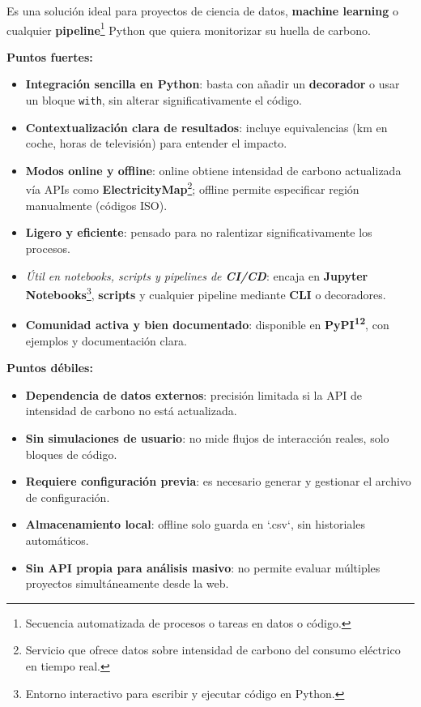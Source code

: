 \documentclass[12pt,a4paper]{report}
\begin{document}
Es una solución ideal para proyectos de ciencia de datos, \textbf{machine learning} o
cualquier \textbf{pipeline}\footnote{Secuencia automatizada de procesos o
  tareas en datos o código.} Python que quiera monitorizar su huella de carbono.

\textbf{Puntos fuertes:}
\begin{itemize}
  \item \textbf{Integración sencilla en Python}: basta con añadir un \textbf{decorador} o usar un bloque \texttt{with}, sin alterar significativamente el código.
  \item \textbf{Contextualización clara de resultados}: incluye equivalencias (km en coche, horas de televisión) para entender el impacto.
  \item \textbf{Modos online y offline}: online obtiene intensidad de carbono actualizada vía APIs como \textbf{ElectricityMap}\footnote{Servicio que ofrece datos sobre intensidad de carbono del consumo eléctrico en tiempo real.}; offline permite especificar región manualmente (códigos ISO).
  \item \textbf{Ligero y eficiente}: pensado para no ralentizar significativamente los procesos.
  \item \textit{Útil en notebooks, scripts y pipelines de \textbf{CI/CD}}: encaja en \textbf{Jupyter Notebooks}\footnote{Entorno interactivo para escribir y ejecutar código en Python.}, \textbf{scripts} y cualquier pipeline mediante \textbf{CLI} o decoradores.
  \item \textbf{Comunidad activa y bien documentado}: disponible en \textbf{PyPI\textsuperscript{12}}, con ejemplos y documentación clara.
\end{itemize}

\textbf{Puntos débiles:}
\begin{itemize}
  \item \textbf{Dependencia de datos externos}: precisión limitada si la API de intensidad de carbono no está actualizada.
  \item \textbf{Sin simulaciones de usuario}: no mide flujos de interacción reales, solo bloques de código.
  \item \textbf{Requiere configuración previa}: es necesario generar y gestionar el archivo de configuración.
  \item \textbf{Almacenamiento local}: offline solo guarda en `.csv`, sin historiales automáticos.
  \item \textbf{Sin API propia para análisis masivo}: no permite evaluar múltiples proyectos simultáneamente desde la web.
\end{itemize}
\end{document}
